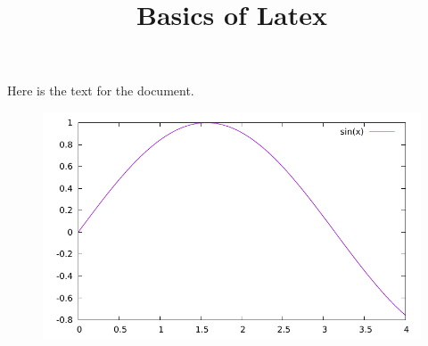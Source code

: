 \documentclass[twocolumn]{article}
\title{Basics of Latex}
\begin{document}
\maketitle

Here is the text for the document. 
\begin{figure}
	\centering
	\includegraphics[width=\linewidth]{plot.pdf}


\end{figure}
\end{document}
